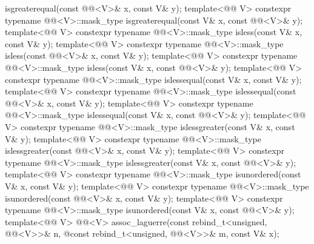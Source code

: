\begin{codeblock}
{      isgreaterequal(const @@<V>& x, const V& y);
  template<@@ V>
    constexpr typename @@<V>::mask_type
      isgreaterequal(const V& x, const @@<V>& y);
  template<@@ V>
    constexpr typename @@<V>::mask_type
      isless(const V& x, const V& y);
  template<@@ V>
    constexpr typename @@<V>::mask_type
      isless(const @@<V>& x, const V& y);
  template<@@ V>
    constexpr typename @@<V>::mask_type
      isless(const V& x, const @@<V>& y);
  template<@@ V>
    constexpr typename @@<V>::mask_type
      islessequal(const V& x, const V& y);
  template<@@ V>
    constexpr typename @@<V>::mask_type
      islessequal(const @@<V>& x, const V& y);
  template<@@ V>
    constexpr typename @@<V>::mask_type
      islessequal(const V& x, const @@<V>& y);
  template<@@ V>
    constexpr typename @@<V>::mask_type
      islessgreater(const V& x, const V& y);
  template<@@ V>
    constexpr typename @@<V>::mask_type
      islessgreater(const @@<V>& x, const V& y);
  template<@@ V>
    constexpr typename @@<V>::mask_type
      islessgreater(const V& x, const @@<V>& y);
  template<@@ V>
    constexpr typename @@<V>::mask_type
      isunordered(const V& x, const V& y);
  template<@@ V>
    constexpr typename @@<V>::mask_type
      isunordered(const @@<V>& x, const V& y);
  template<@@ V>
    constexpr typename @@<V>::mask_type
      isunordered(const V& x, const @@<V>& y);
  template<@@ V>
    @@<V> assoc_laguerre(const rebind_t<unsigned, @@<V>>& n,
                                   @\itcorr@ const rebind_t<unsigned, @@<V>>& m, const V& x);
}
\end{codeblock}
